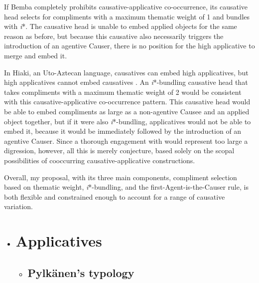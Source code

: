 \documentclass[output=paper,modfonts,nonflat]{langsci/langscibook}
\begin{document}
If Bemba completely prohibits causative-applicative co-occurrence, its causative head selects for compliments with a maximum thematic weight of 1 and bundles with \textit{i}*. The causative head is unable to embed applied objects for the same reason as before, but because this causative also necessarily triggers the introduction of an agentive Causer, there is no position for the high applicative to merge and embed it. 



In Hiaki, an Uto-Aztecan language, causatives can embed high applicatives, but high applicatives cannot embed causatives \citep{Jung2014}. An \textit{i}*-bundling causative head that takes compliments with a maximum thematic weight of 2 would be consistent with this causative-applicative co-occurrence pattern. This causative head would be able to embed compliments as large as a non-agentive Causee and an applied object together, but if it were also \textit{i}*-bundling, applicatives would not be able to embed it, because it would be immediately followed by the introduction of an agentive Causer. Since a thorough engagement with \citet{Jung2014} would represent too large a digression, however, all this is merely conjecture, based solely on the scopal possibilities of cooccurring causative-applicative constructions. 


Overall, my proposal, with its three main components, compliment selection based on thematic weight, \textit{i}*-bundling, and the first-Agent-is-the-Causer rule, is both flexible and constrained enough to account for a range of causative variation. 

\begin{itemize}
\item \section{Applicatives}

\begin{itemize}
\item \subsection{Pylkänen’s typology}
\end{itemize}
\end{itemize}
\end{document}
